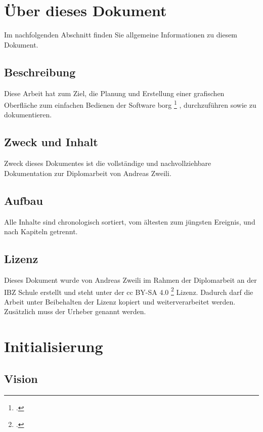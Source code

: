 
\section{Über dieses Dokument}
\label{sec:org3e817e2}

Im nachfolgenden Abschnitt finden Sie allgemeine Informationen zu
diesem Dokument.

\subsection{Beschreibung}
\label{sec:org4722874}

Diese Arbeit hat zum Ziel, die Planung und Erstellung einer grafischen
Oberfläche zum einfachen Bedienen der Software \gls{borg} \footcite{borgbackup} ,
durchzuführen sowie zu dokumentieren.

\subsection{Zweck und Inhalt}
\label{sec:org68956a6}

Zweck dieses Dokumentes ist die vollständige und nachvollziehbare Dokumentation
zur Diplomarbeit von Andreas Zweili.

\subsection{Aufbau}
\label{sec:org0d37fdc}

Alle Inhalte sind chronologisch sortiert, vom ältesten zum jüngsten
Ereignis, und nach Kapiteln getrennt.

\subsection{Lizenz}
\label{sec:orgd1bc1a7}

Dieses Dokument wurde von Andreas Zweili im Rahmen der Diplomarbeit an der IBZ
Schule erstellt und steht unter der \gls{cc} BY-SA 4.0 \footcite{cc} Lizenz.
Dadurch darf die Arbeit unter Beibehalten der Lizenz kopiert und
weiterverarbeitet werden. Zusätzlich muss der Urheber genannt werden.

\section{Initialisierung}
\label{sec:org7d5dba1}
\subsection{Vision}
\label{sec:org9ec13ed}

